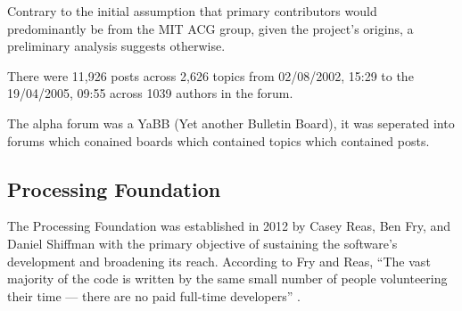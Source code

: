 

Contrary to the initial assumption that primary contributors would predominantly be from the MIT ACG group, given the project's origins, a preliminary analysis suggests otherwise.

%

%

%

%


There were 11,926 posts across 2,626 topics from 02/08/2002, 15:29 to the 19/04/2005, 09:55 across 1039 authors in the forum.

The alpha forum was a YaBB (Yet another Bulletin Board), it was seperated into forums which conained boards which contained topics which contained posts.



\subsection{Processing Foundation}

The Processing Foundation was established in 2012 by Casey Reas, Ben Fry, and Daniel Shiffman with the primary objective of sustaining the software's development and broadening its reach. According to Fry and Reas, ``The vast majority of the code is written by the same small number of people volunteering their time — there are no paid full-time developers'' \parencite[p.~13]{fryModernPrometheusHistory2018}.

